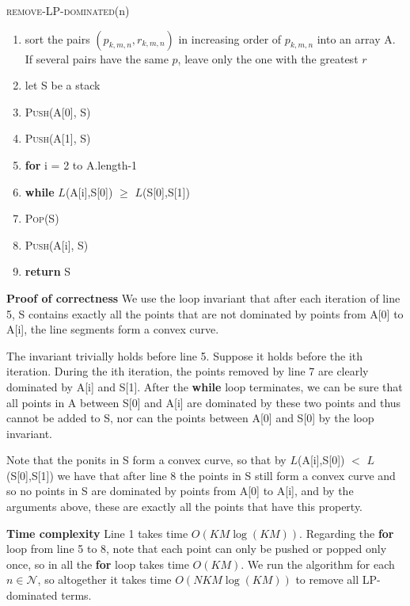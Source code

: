 \documentclass[11pt, oneside]{report}
\begin{document}
\noindent\textsc{remove-LP-dominated}(n)
\begin{enumerate}[1\ ]
\setlength{\topsep}{0.05ex}
\setlength{\itemsep}{0.05ex}
\item sort the pairs $(p_{k,m,n}, r_{k,m,n})$ in increasing order of $p_{k,m,n}$ into an array A. If several pairs have the same $p$, leave only the one with the greatest $r$
\item let S be a stack
\item \textsc{Push}(A[0], S)
\item \textsc{Push}(A[1], S)
\item \textbf{for} i = 2 to A.length-1
\item \qquad \textbf{while} $L$(A[i],S[0]) $\ge$ $L$(S[0],S[1])
\item \qquad \qquad\textsc{Pop}(S)
\item \qquad \textsc{Push}(A[i], S)
\item \textbf{return} S
\end{enumerate}

\noindent\textbf{Proof of correctness} We use the loop invariant that after each iteration of line 5, S contains exactly all the points that are not dominated by points from A[0] to A[i], the line segments form a convex curve.

The invariant trivially holds before line 5. Suppose it holds before the ith iteration. During the ith iteration, the points removed by line 7 are clearly dominated by A[i] and S[1]. After the \textbf{while} loop terminates, we can be sure that all points in A between S[0] and A[i] are dominated by these two points and thus cannot be added to S, nor can the points between A[0] and S[0] by the loop invariant.

Note that the ponits in S form a convex curve, so that by $L$(A[i],S[0]) $<$ $L$(S[0],S[1]) we have that after line 8 the points in S still form a convex curve and so no points in S are dominated by points from A[0] to A[i], and by the arguments above, these are exactly all the points that have this property.

\hspace{1em}

\noindent\textbf{Time complexity} Line 1 takes time $O(KM\log(KM))$. Regarding the \textbf{for} loop from line 5 to 8, note that each point can only be pushed or popped only once, so in all the \textbf{for} loop takes time $O(KM)$. We run the algorithm for each $n\in\mathcal{N}$, so altogether it takes time $O(NKM\log(KM))$ to remove all LP-dominated terms.
\end{document}
